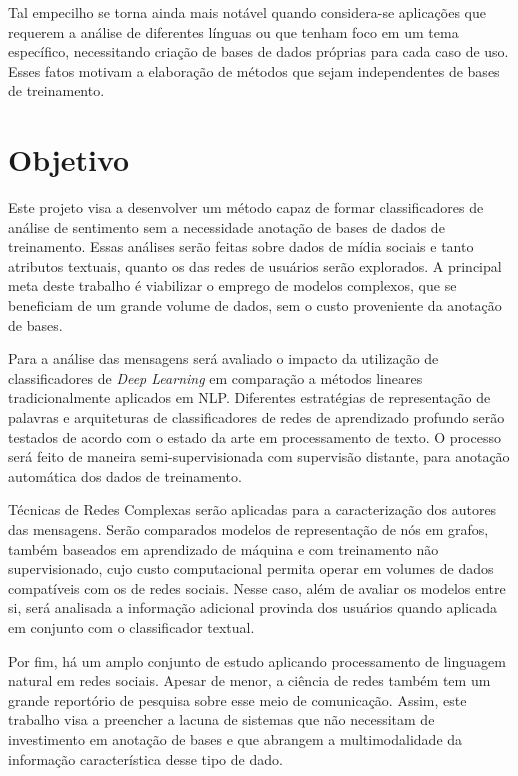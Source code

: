 Tal empecilho se torna ainda mais notável quando considera-se aplicações que
requerem a análise de diferentes línguas ou que tenham foco em um tema
específico, necessitando criação de bases de dados próprias para cada caso de
uso.
Esses fatos motivam a elaboração de métodos que sejam independentes de bases de
treinamento.

\section{Objetivo}

Este projeto visa a desenvolver um método capaz de formar classificadores de
análise de sentimento sem a necessidade anotação de bases de dados de treinamento.
Essas análises serão feitas sobre dados de mídia sociais e tanto atributos
textuais, quanto os das redes de usuários serão explorados.
A principal meta deste trabalho é viabilizar o emprego de modelos complexos,
que se beneficiam de um grande volume de dados, sem o custo proveniente da anotação
de bases.

Para a análise das mensagens será avaliado o impacto da utilização de
classificadores de \textit{Deep Learning} em comparação a métodos lineares
tradicionalmente aplicados em NLP.
Diferentes estratégias de representação de palavras e arquiteturas de
classificadores de redes de aprendizado profundo serão testados de acordo com o
estado da arte em processamento de texto.
O processo será feito de maneira semi-supervisionada com supervisão distante,
para anotação automática dos dados de treinamento.

Técnicas de Redes Complexas serão aplicadas para a caracterização dos autores das
mensagens.
Serão comparados modelos de representação de nós em grafos, também baseados em
aprendizado de máquina e com treinamento não supervisionado, cujo custo
computacional permita operar em volumes de dados compatíveis com os de redes
sociais.
Nesse caso, além de avaliar os modelos entre si, será analisada a informação
adicional provinda dos usuários quando aplicada em conjunto com o classificador
textual.

Por fim, há um amplo conjunto de estudo aplicando processamento de linguagem
natural em redes sociais.
Apesar de menor, a ciência de redes também tem um grande reportório de pesquisa
sobre esse meio de comunicação.
Assim, este trabalho visa a preencher a lacuna de sistemas que não necessitam de
investimento em anotação de bases e que abrangem a multimodalidade da
informação característica desse tipo de dado.

